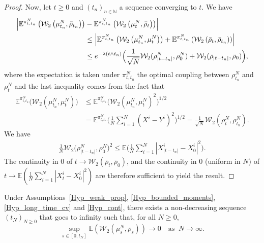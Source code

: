 \begin{proof}
Now, let $t\geq0$ and $(t_n)_{n\in\mathbb{N}}$ a sequence converging to $t$. We have
\begin{align*}
\Bigl|\mathbb{E}^{\pi^N_{t,t_n}}\left(\mathcal{W}_2\left(\mu^N_{t_n},\bar{\rho}_{t_n}\right)\right)&-\mathbb{E}^{\pi^N_{t,t_n}}\left(\mathcal{W}_2\left(\mu^N_{t},\bar{\rho}_{t}\right)\right)\Bigr|\\
&\leq \left|\mathbb{E}^{\pi^N_{t,t_n}}\left(\mathcal{W}_2\left(\mu^N_{t_n},\mu^N_{t}\right)\right)+\mathbb{E}^{\pi^N_{t,t_n}}\left(\mathcal{W}_2\left(\bar{\rho}_{t},\bar{\rho}_{t_n}\right)\right)\right|\\
&\leq e^{-\lambda (t\wedge t_n)}\Bigl(\frac{1}{\sqrt{N}}\mathcal{W}_2(\rho^N_{|t-t_n|},\rho^N_{0})+\mathcal{W}_2(\bar{\rho}_{|t-t_n|},\bar{\rho}_{0}) \Bigr),
\end{align*}
where the expectation is taken under $\pi^N_{t,t_n}$ the optimal coupling between $\rho^N_{t_n}$ and $\rho^N_{t}$ and the last inequality comes from the fact that
\begin{align*}
\mathbb{E}^{\pi^N_{t,t_n}}\bigl(\mathcal{W}_2\left(\mu^N_{t_n},\mu^N_{t}\right)\bigr)&\leq\mathbb{E}^{\pi^N_{t,t_n}}\bigl(\mathcal{W}_2\left(\mu^N_{t_n},\mu^N_{t}\right)^2\bigr)^{1/2}\\
&=\mathbb{E}^{\pi^N_{t,t_n}}\biggl(\frac{1}{N}\sum_{i=1}^N(X^i-Y^i)^2\biggr)^{1/2}=\frac{1}{\sqrt{N}}\mathcal{W}_2\left(\rho^N_{t},\rho^N_{t_n}\right).
\end{align*}
We have
\begin{align*}
\frac{1}{N}\mathcal{W}_2\bigl(\rho^N_{|t-t_n|},\rho^N_{0}\bigr)^2\leq \mathbb{E}\biggl(\frac{1}{N}\sum_{i=1}^N|X^i_{|t-t_n|}-X^i_0|^2\biggr).
\end{align*}
The continuity in $0$ of ${t\to\mathcal{W}_2\left(\bar{\rho}_{t},\bar{\rho}_{0}\right)}$, and the continuity in $0$ (uniform in $N$) of ${t\to\mathbb{E}\left(\frac{1}{N}\sum_{i=1}^N|X^i_t-X^i_0|^2\right)}$ are therefore sufficient to yield the result.
\end{proof}

\begin{lemma}\label{t_N_def}
Under Assumptions~\ref{Hyp_weak_prop}, \ref{Hyp_bounded_moments}, \ref{Hyp_long_time_cv} and \ref{Hyp_cont}, there exists a non-decreasing sequence $(t_N)_{N\geq0}$ that goes to infinity such that, for all $N\geq0$,
\begin{equation}\label{Prop_1}
\sup_{s\in[0,t_N]}\mathbb{E}\left(\mathcal{W}_2\left(\mu^N_{s},\bar{\rho}_{s}\right)\right)\to 0\quad\text{as }\ N\to\infty.
\end{equation}
\end{lemma}

